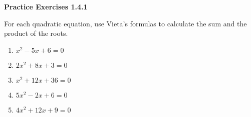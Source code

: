\noindent\textbf{Practice Exercises 1.4.1}


For each quadratic equation, use Vieta's formulas to calculate the sum and the product of the roots.

\begin{multicols}{2}
\begin{enumerate}[label = \color{blue}\arabic*. ]
   \item $ x^2 - 5x + 6 = 0 $
   \item $ 2x^2 + 8x + 3 = 0 $
   \item $ x^2 + 12x + 36 = 0 $
   \item $ 5x^2 - 2x + 6 = 0 $
   \item $ 4x^2 + 12x + 9 = 0 $
\end{enumerate}
\end{multicols} 
